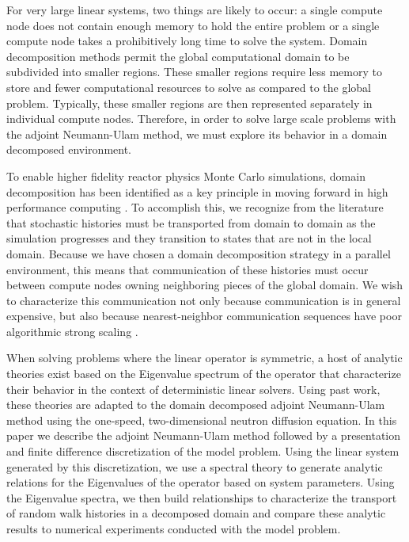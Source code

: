 \documentclass{mc2013}
\begin{document}
For very large linear systems, two things are likely to occur: a
single compute node does not contain enough memory to hold the entire
problem or a single compute node takes a prohibitively long time to
solve the system. Domain decomposition methods permit the global
computational domain to be subdivided into smaller regions. These
smaller regions require less memory to store and fewer computational
resources to solve as compared to the global problem. Typically, these
smaller regions are then represented separately in individual compute
nodes. Therefore, in order to solve large scale problems with the
adjoint Neumann-Ulam method, we must explore its behavior in a domain
decomposed environment.

To enable higher fidelity reactor physics Monte Carlo simulations,
domain decomposition has been identified as a key principle in moving
forward in high performance computing
\cite{brunner_comparison_2006,siegel_analysis_2012}. To accomplish
this, we recognize from the literature that stochastic histories must
be transported from domain to domain as the simulation progresses and
they transition to states that are not in the local domain. Because we
have chosen a domain decomposition strategy in a parallel environment,
this means that communication of these histories must occur between
compute nodes owning neighboring pieces of the global domain. We wish
to characterize this communication not only because communication is
in general expensive, but also because nearest-neighbor communication
sequences have poor algorithmic strong scaling
\cite{gropp_high-performance_2001}.

When solving problems where the linear operator is symmetric, a host
of analytic theories exist based on the Eigenvalue spectrum of the
operator that characterize their behavior in the context of
deterministic linear solvers. Using past work, these theories are
adapted to the domain decomposed adjoint Neumann-Ulam method using the
one-speed, two-dimensional neutron diffusion equation. In this paper
we describe the adjoint Neumann-Ulam method followed by a presentation
and finite difference discretization of the model problem. Using the
linear system generated by this discretization, we use a spectral
theory to generate analytic relations for the Eigenvalues of the
operator based on system parameters. Using the Eigenvalue spectra, we
then build relationships to characterize the transport of random walk
histories in a decomposed domain and compare these analytic results to
numerical experiments conducted with the model problem.
\end{document}
